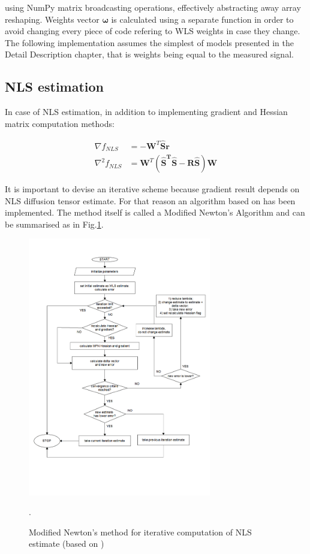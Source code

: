 using NumPy matrix broadcasting operations, effectively abstracting away array reshaping. Weights vector $\boldsymbol{\omega}$ is calculated using a separate function in order to avoid changing every piece of code refering to WLS weights in case they change. The following implementation assumes the simplest of models presented in the Detail Description chapter, that is weights being equal to the measured signal.

\subsection{NLS estimation}

In case of NLS estimation, in addition to implementing gradient and Hessian matrix computation methods:

\begin{equation}
\begin{aligned}
\nabla{f_{NLS}}&=-\boldsymbol{W}^T\boldsymbol{\hat{S}}\boldsymbol{r} \\
\nabla^2{f_{NLS}}&=\boldsymbol{W}^T\left(\boldsymbol{\hat{S}^T\hat{S}-\boldsymbol{R\hat{S}}}\right)\boldsymbol{W}
\end{aligned}
\label{Eq:m6_impl_2}
\end{equation}

It is important to devise an iterative scheme because gradient result depends on NLS diffusion tensor estimate. For that reason an algorithm based on \cite{m6_koay2006a} has been implemented. The method itself is called a Modified Newton's Algorithm and can be summarised as in Fig.\ref{fig:m6_pic_1}.

\begin{figure}[H]
	\includegraphics[width=8cm]{figures/Module_06/mfn_simple}
	\centering
	\caption{Modified Newton's method for iterative computation of NLS estimate \vbox{(based on \cite{m6_koay2006a})}}.
	\label{fig:m6_pic_1}
\end{figure}


